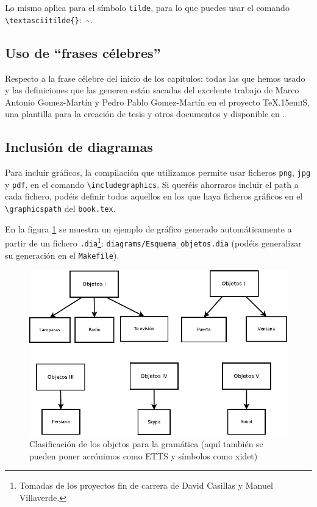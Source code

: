 \documentclass[spanish,openright]{book}
\def\texis{\TeX \raise.15em\hbox{\textsc{i}}S}
\begin{document}
Lo mismo aplica para el símbolo \texttt{tilde}, para lo que puedes usar
el comando \texttt{\textbackslash{}textasciitilde\{\}}:~\textasciitilde{}.


\subsection{Uso de ``frases célebres''}
\label{sec:uso-de-frases}

Respecto a la frase célebre del inicio de los capítulos: todas las que
hemos usado y las definiciones que las generen están sacadas del
excelente trabajo de Marco Antonio Gomez-Martín y Pedro Pablo
Gomez-Martín en el proyecto \texis, una plantilla para la creación de
tesis y otros documentos y disponible en \cite{texis}.


\subsection{Inclusión de diagramas}
\label{sec:diagrama}

Para incluir gráficos, la compilación que utilizamos permite usar
ficheros \texttt{png}, \texttt{jpg} y \texttt{pdf}, en el comando
\texttt{\textbackslash{}includegraphics}. Si queréis ahorraros incluir
el path a cada fichero, podéis definir todos aquellos en los que haya
ficheros gráficos en el \texttt{\textbackslash{}graphicspath} del
\texttt{book.tex}.

En la figura \ref{fig:fig_clobj} se muestra un ejemplo de gráfico
generado automáticamente a partir de un fichero
\texttt{.dia}\footnote{Tomadas de los proyectos fin de carrera de David
Casillas y Manuel Villaverde.}: \texttt{diagrams/Esquema\_objetos.dia}
(podéis generalizar su generación en el \texttt{Makefile}).

\begin{figure}[tphb]
\centering
\includegraphics{Esquema_objetos}
\caption{Clasificación de los objetos para la gramática (aquí también
se pueden poner acrónimos como \acs{ETTS} y símbolos como \ac{xidet})}
\label{fig:fig_clobj}
\end{figure}
\end{document}
